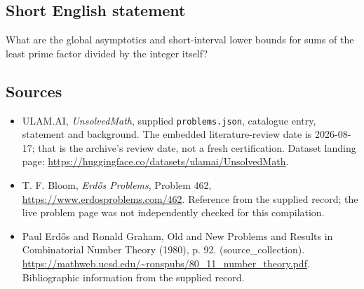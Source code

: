 \documentclass[11pt,a4paper]{article}
\begin{document}
\subsection{Short English statement}

What are the global asymptotics and short-interval lower bounds for sums of the least prime factor divided by the integer itself?

\subsection{Sources}

{\small

\begin{itemize}

\item[\hypertarget{source:statement:1}{S1}] ULAM.AI, \emph{UnsolvedMath}, supplied \texttt{problems.json}, catalogue entry, statement and background. The embedded literature-review date is 2026-08-17; that is the archive’s review date, not a fresh certification. Dataset landing page: \url{https://huggingface.co/datasets/ulamai/UnsolvedMath}.

\item[\hypertarget{source:statement:2}{S2}] T. F. Bloom, \emph{Erdős Problems}, Problem 462, \url{https://www.erdosproblems.com/462}. Reference from the supplied record; the live problem page was not independently checked for this compilation.

\item[\hypertarget{source:statement:3}{S3}] Paul Erdős and Ronald Graham, Old and New Problems and Results in Combinatorial Number Theory (1980), p. 92. (source\_collection). \url{https://mathweb.ucsd.edu/~ronspubs/80_11_number_theory.pdf}. Bibliographic information from the supplied record.

\end{itemize}

}

\label{end:statement}
\end{document}

